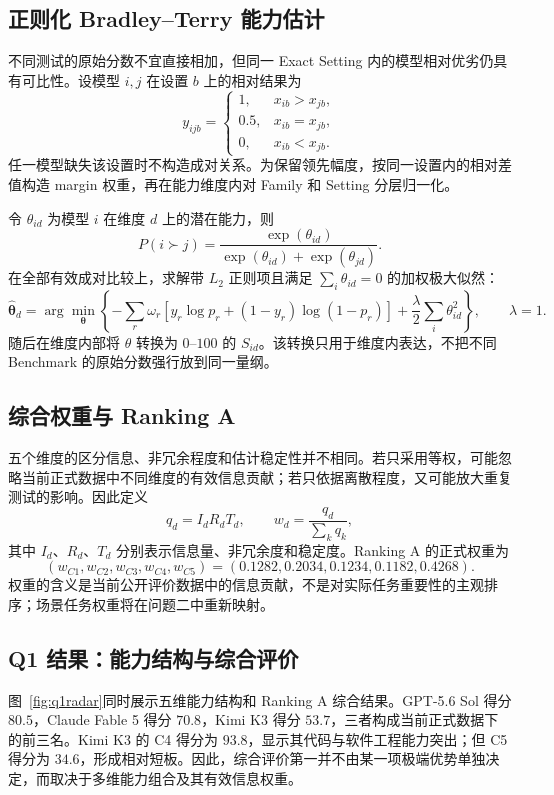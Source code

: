 \subsection{正则化 Bradley--Terry 能力估计}

不同测试的原始分数不宜直接相加，但同一 Exact Setting 内的模型相对优劣仍具有可比性。设模型 \(i,j\) 在设置 \(b\) 上的相对结果为
\[
y_{ijb}=
\begin{cases}
1,&x_{ib}>x_{jb},\\
0.5,&x_{ib}=x_{jb},\\
0,&x_{ib}<x_{jb}.
\end{cases}
\]
任一模型缺失该设置时不构造成对关系。为保留领先幅度，按同一设置内的相对差值构造 margin 权重，再在能力维度内对 Family 和 Setting 分层归一化。

令 \(\theta_{id}\) 为模型 \(i\) 在维度 \(d\) 上的潜在能力，则
\[
P(i\succ j)=
\frac{\exp(\theta_{id})}
{\exp(\theta_{id})+\exp(\theta_{jd})}.
\]
在全部有效成对比较上，求解带 \(L_2\) 正则项且满足 \(\sum_i\theta_{id}=0\) 的加权极大似然：
\[
\widehat{\boldsymbol\theta}_d
=\arg\min_{\boldsymbol\theta}
\left\{
-\sum_r\omega_r[y_r\log p_r+(1-y_r)\log(1-p_r)]
+\frac{\lambda}{2}\sum_i\theta_{id}^{2}
\right\},\qquad \lambda=1.
\]
随后在维度内部将 \(\theta\) 转换为 \(0\)--\(100\) 的 \(S_{id}\)。该转换只用于维度内表达，不把不同 Benchmark 的原始分数强行放到同一量纲。

\subsection{综合权重与 Ranking A}

五个维度的区分信息、非冗余程度和估计稳定性并不相同。若只采用等权，可能忽略当前正式数据中不同维度的有效信息贡献；若只依据离散程度，又可能放大重复测试的影响。因此定义
\[
q_d=I_dR_dT_d,\qquad
w_d=\frac{q_d}{\sum_kq_k},
\]
其中 \(I_d\)、\(R_d\)、\(T_d\) 分别表示信息量、非冗余度和稳定度。Ranking A 的正式权重为
\[
(w_{C1},w_{C2},w_{C3},w_{C4},w_{C5})
=(0.1282,0.2034,0.1234,0.1182,0.4268).
\]
权重的含义是当前公开评价数据中的信息贡献，不是对实际任务重要性的主观排序；场景任务权重将在问题二中重新映射。

\subsection{Q1 结果：能力结构与综合评价}

图~\ref{fig:q1radar}同时展示五维能力结构和 Ranking A 综合结果。GPT-5.6 Sol 得分 \(80.5\)，Claude Fable 5 得分 \(70.8\)，Kimi K3 得分 \(53.7\)，三者构成当前正式数据下的前三名。Kimi K3 的 C4 得分为 \(93.8\)，显示其代码与软件工程能力突出；但 C5 得分为 \(34.6\)，形成相对短板。因此，综合评价第一并不由某一项极端优势单独决定，而取决于多维能力组合及其有效信息权重。

